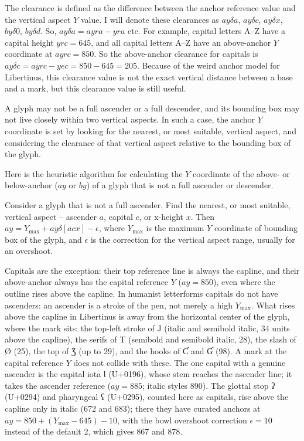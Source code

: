 \documentclass[landscape]{article}
\begin{document}
The clearance is defined as the difference between the anchor reference value 
and the vertical aspect $Y$ value.
I will denote these clearances as 
$ay\delta a$, $ay\delta c$, $ay\delta x$, $by\delta 0$, $by\delta d$.
So, $ay\delta a = ayra - yra$ etc.
For example, capital letters A--Z have a capital height $yrc = 645$, 
and all capital letters A--Z have an above-anchor $Y$ coordinate at $ayrc = 850$. 
So the above-anchor clearance for capitals is $ay\delta c = ayrc - yec = 850 - 645 = 205$.
Because of the weird anchor model for Libertinus, this clearance value is not the 
exact vertical distance between a base and a mark, but this clearance value is still useful.

A glyph may not be a full ascender or a full descender, 
and its bounding box may not live closely within two vertical aspects.
In such a case, the anchor $Y$ coordinate is set by looking for the nearest, or most suitable, 
vertical aspect, and considering the clearance of that vertical aspect relative 
to the bounding box of the glyph.


Here is the heuristic algorithm for calculating the $Y$ coordinate of the above- or below-anchor 
($ay$ or $by$) of a glyph that is not a full ascender or descender. 

Consider a glyph that is not a full ascender. 
Find the nearest, or most suitable, vertical aspect -- ascender $a$, capital $c$, or x-height $x$.
Then $ay = Y_\mathrm{max} + ay\delta[acx] - \epsilon$, 
where $Y_\mathrm{max}$ is the maximum $Y$ coordinate of bounding box of the glyph, 
and $\epsilon$ is the correction for the vertical aspect range, usually for an overshoot.

Capitals are the exception: their top reference line is always the capline, and their above-anchor always has the capital reference $Y$
($ay = 850$), even where the outline rises above the capline.
In humanist letterforms capitals do not have ascenders: an ascender is a stroke of the pen, not merely a high $Y_\mathrm{max}$.
What rises above the capline in Libertinus is away from the horizontal center of the glyph, where the mark sits:
the top-left stroke of J (italic and semibold italic, 34 units above the capline), the serifs of T (semibold and semibold italic, 28),
the slash of Ø (25), the top of Ʒ (up to 29), and the hooks of Ƈ and Ɠ (98).
A mark at the capital reference $Y$ does not collide with these.
The one capital with a genuine ascender is the capital iota Ɩ (U+0196), whose stem reaches the ascender line;
it takes the ascender reference ($ay = 885$; italic styles 890).
The glottal stop ʔ (U+0294) and pharyngeal ʕ (U+0295), counted here as capitals, rise above the capline only in italic (672 and 683);
there they have curated anchors at $ay = 850 + (Y_\mathrm{max} - 645) - 10$, 
with the bowl overshoot correction $\epsilon = 10$ instead of the default 2, which gives 867 and 878.
\end{document}
